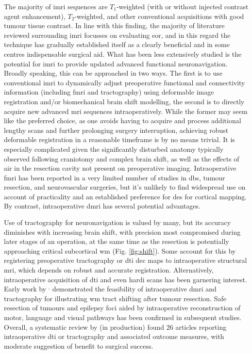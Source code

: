 The majority of \gls{imri} sequences are $T_1$-weighted (with or without injected contrast agent enhancement), $T_2$-weighted, and other conventional acquisitions with good tumour tissue contrast\autocite{Kubben2011,Coburger2019}.
In line with this finding, the majority of literature reviewed surrounding \gls{imri} focusses on evaluating \gls{eor}, and in this regard the technique has gradually established itself as a clearly beneficial and in some centres indispensable surgical aid\autocite{Garzon-Muvdi2019,Hlavac2020}.
What has been less extensively studied is the potential for \gls{imri} to provide updated advanced functional neuronavigation.
Broadly speaking, this can be approached in two ways.
The first is to use conventional \gls{imri} to dynamically adjust preoperative functional and connectivity information (including \gls{fmri} and tractography) using deformable image registration and/or biomechanical brain shift modelling, the second is to directly acquire new advanced \gls{mri} sequences intraoperatively.
While the former may seem like the preferred choice, as one avoids having to acquire and process additional lengthy scans and further prolonging surgery interruption, achieving robust deformable registration in a reasonable timeframe is by no means trivial.
It is especially complicated given the significantly disturbed anatomy typically observed following craniotomy and complex brain shift, as well as the effects of air in the resection cavity not present on preoperative imaging.
Intraoperative \gls{fmri} has been reported in a very limited number of studies in \gls{dbs}\autocite{Hiss2015,Knight2015}, tumour resection\autocite{Roder2016a,Qiu2017a}, and neurovascular\autocite{Muscas2019} surgeries, but it's unlikely to find widespread use on account of practicality and an established preference for \gls{des} for cortical mapping.
By contrast, intraoperative \gls{dmri} has several potential advantages.

Use of tractography for neuronavigation is valued by many, but its accuracy diminishes with increasing brain shift, with precision most compromised during later stages of an operation, at the same time as the resection is potentially approaching critical subcortical \gls{wm}\autocite{Yang2019} (Fig. \ref{fig:shift}).
Some account for this by registering preoperative tractography or \gls{dti} \gls{dec} maps to intraoperative structural \gls{mri}\autocite{Nimsky2006a,Tamura2022}, which depends on robust and accurate registration\autocite{Beare2016}.
Alternatively, intraoperative acquisition of \gls{dti} and even \gls{hardi} scans has been garnering interest.
Early work by \textcite{Nimsky2005}$^,$\autocite{Nimsky2005a} demonstrated the feasibility of intraoperative \gls{dmri} and tractography for illustrating \gls{wm} tract shifting after tumour resection.
Safe resection of tumours and epilepsy foci aided by intraoperative reconstruction of motor\autocite{Maesawa2010,Javadi2017}, language\autocite{DAndrea2016,Li2021} and visual\autocite{Daga2012,Cui2015} pathways has been confirmed in subsequent studies.
Overall, a systematic review by \citeauthor{Aylmore} (in production)\autocite{Aylmore} found 26 articles reporting intraoperative \gls{dti} or tractography and associated outcome measures, with moderate suggestion of benefit to surgical success.

